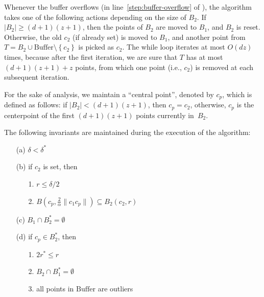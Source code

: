 \documentclass[envcountsame]{cls/cccg15}
\newcommand{\cp}{c_p}
\newcommand{\dz}{(d + 1)(z + 1)}
\newcommand{\Buffer}{\ensuremath{\text{Buffer}}}
\newcommand{\set}[1]{\left\{ #1 \right\}}
\newcommand{\card}[1]{\left|{#1}\right|}
\newcommand{\len}[1]{\|{#1}\|}
\newcommand{\radius}[1]{\frac{2}{\alpha} \len{c_1 #1}}
\newcommand{\lee}{\leqslant}
\newcommand{\gee}{\geqslant}
\renewcommand{\leq}{\lee}
\renewcommand{\le}{\lee}
\renewcommand{\ge}{\gee}
\begin{document}
Whenever the buffer overflows (in line~\ref{step:buffer-overflow} of ),
the algorithm takes one of the following actions
depending on the size of $B_2$. 
If $|B_2| \ge \dz$, then the points of $B_2$ are moved to $B_1$, and $B_2$ is reset.
Otherwise, the old $c_2$ (if already set) is moved to $B_1$,
and another point from $T = B_2 \cup \Buffer \setminus \set{c_2}$ is picked as $c_2$.
The while loop iterates at most $O(dz)$ times,
because after the first iteration, we are sure 
that $T$ has at most $\dz + z$ points, from which 
one point (i.e., $c_2$) is removed at each subsequent iteration.


For the sake of analysis, we maintain a ``central point'', 
denoted by $\cp$, %
which is defined as follows:
if $\card{B_2} < \dz$, then $\cp = c_2$, otherwise,
$\cp$ is the centerpoint of the first $\dz$ points currently in~$B_2$.

\begin{lemma}
\label{lem:invariants}
	The following invariants are maintained during the execution of the algorithm:

\begin{enumerate}
\item [(a)] $\delta < \delta^*$ %
\item [(b)] if $c_2$ is set, then
\begin{enumerate}
	\item[1.] $r \leq \delta/2$
	\item[2.] $B(c_p, \radius{c_p}) \subseteq B_2(c_2, r)$
\end{enumerate}
\item [(c)] $B_1 \cap B_2^* = \emptyset$
\item [(d)]  if $\cp \in B_2^*$, then 
	\begin{enumerate}
		\item [1.] $2r^* \le r$
		\item [2.] $B_2 \cap B_1^* = \emptyset$
		\item [3.] all points in $\Buffer$ are outliers
	\end{enumerate}

\end{enumerate}
\end{lemma}
\end{document}
